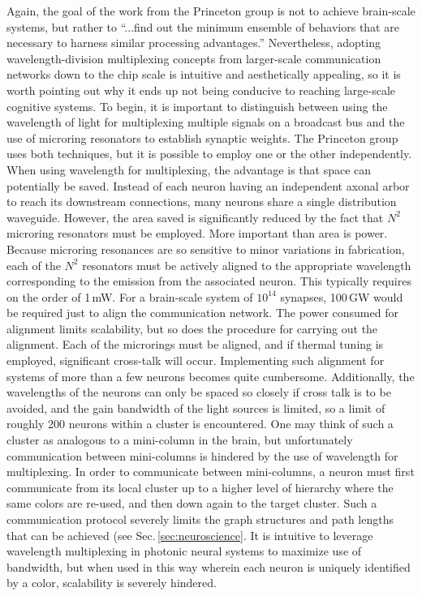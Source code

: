 \documentclass[twocolumn]{article}
\begin{document}
Again, the goal of the work from the Princeton group is not to achieve brain-scale systems, but rather to ``...find out the minimum ensemble of behaviors that are necessary to harness similar processing advantages.'' \cite{prsh2017} Nevertheless, adopting wavelength-division multiplexing concepts from larger-scale communication networks down to the chip scale is intuitive and aesthetically appealing, so it is worth pointing out why it ends up not being conducive to reaching large-scale cognitive systems. To begin, it is important to distinguish between using the wavelength of light for multiplexing multiple signals on a broadcast bus and the use of microring resonators to establish synaptic weights. The Princeton group uses both techniques, but it is possible to employ one or the other independently. When using wavelength for multiplexing, the advantage is that space can potentially be saved. Instead of each neuron having an independent axonal arbor to reach its downstream connections, many neurons share a single distribution waveguide. However, the area saved is significantly reduced by the fact that $N^2$ microring resonators must be employed. More important than area is power. Because microring resonances are so sensitive to minor variations in fabrication, each of the $N^2$ resonators must be actively aligned to the appropriate wavelength corresponding to the emission from the associated neuron. This typically requires on the order of 1\,mW. For a brain-scale system of $10^{14}$ synapses, 100\,GW would be required just to align the communication network. The power consumed for alignment limits scalability, but so does the procedure for carrying out the alignment. Each of the microrings must be aligned, and if thermal tuning is employed, significant cross-talk will occur. Implementing such alignment for systems of more than a few neurons becomes quite cumbersome. Additionally, the wavelengths of the neurons can only be spaced so closely if cross talk is to be avoided, and the gain bandwidth of the light sources is limited, so a limit of roughly 200 neurons within a cluster is encountered. One may think of such a cluster as analogous to a mini-column in the brain, but unfortunately communication between mini-columns is hindered by the use of wavelength for multiplexing. In order to communicate between mini-columns, a neuron must first communicate from its local cluster up to a higher level of hierarchy where the same colors are re-used, and then down again to the target cluster. Such a communication protocol severely limits the graph structures and path lengths that can be achieved (see Sec.\,\ref{sec:neuroscience}. It is intuitive to leverage wavelength multiplexing in photonic neural systems to maximize use of bandwidth, but when used in this way wherein each neuron is uniquely identified by a color, scalability is severely hindered.
\end{document}
